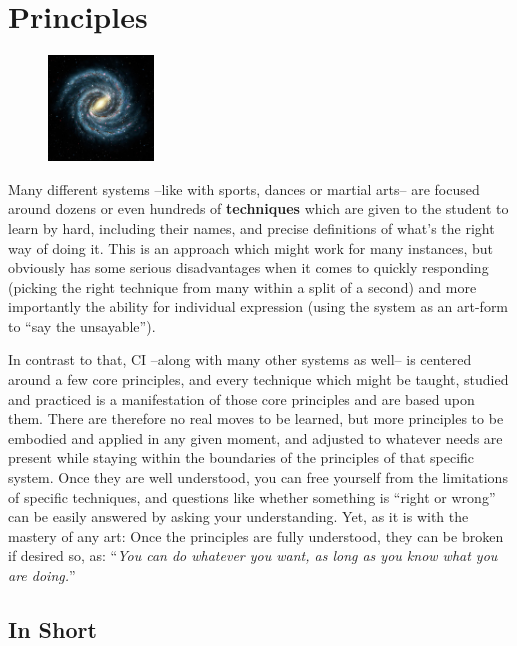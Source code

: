 \chapter{Principles}\label{ch:principles}

\begin{figure}
    \centering
    \includegraphics[width=0.25\textwidth]{images/principles}
\end{figure}

Many different systems --like with sports, dances or martial arts-- are focused around dozens or even hundreds of \textbf{techniques} which are given to the student to learn by hard, including their names, and precise definitions of what's the right way of doing it.
This is an approach which might work for many instances, but obviously has some serious disadvantages when it comes to quickly responding (picking the right technique from many within a split of a second) and more importantly the ability for individual expression (using the system as an art-form to ``say the unsayable'').

In contrast to that, CI --along with many other systems as well-- is centered around a few core principles, and every technique which might be taught, studied and practiced is a manifestation of those core principles and are based upon them.
There are therefore no real moves to be learned, but more principles to be embodied and applied in any given moment, and adjusted to whatever needs are present while staying within the boundaries of the principles of that specific system.
Once they are well understood, you can free yourself from the limitations of specific techniques, and questions like whether something is ``right or wrong'' can be easily answered by asking your understanding.
Yet, as it is with the mastery of any art: Once the principles are fully understood, they can be broken if desired so, as: ``\textit{You can do whatever you want, as long as you know what you are doing.}''

\section{In Short}\label{sec:in-short}

